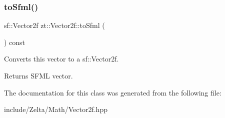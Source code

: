 \subsubsection{\texorpdfstring{to\+Sfml()}{toSfml()}}
{\footnotesize\ttfamily sf\+::\+Vector2f zt\+::\+Vector2f\+::to\+Sfml (\begin{DoxyParamCaption}{ }\end{DoxyParamCaption}) const}

Converts this vector to a sf\+::\+Vector2f. \begin{DoxyReturn}{Returns}
S\+F\+ML vector. 
\end{DoxyReturn}


The documentation for this class was generated from the following file\+:\begin{DoxyCompactItemize}
\item 
include/\+Zelta/\+Math/Vector2f.\+hpp\end{DoxyCompactItemize}
